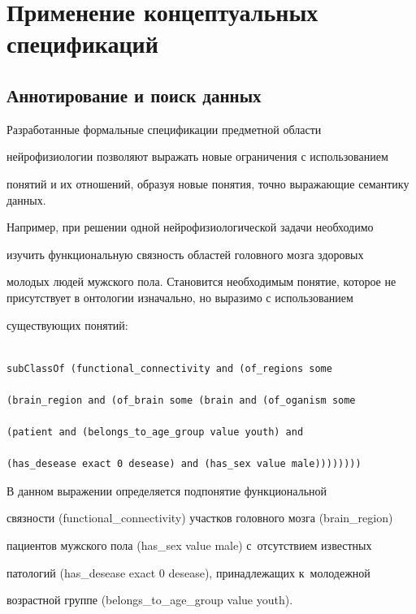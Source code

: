 \section{Применение концептуальных спецификаций}



\subsection{Аннотирование и поиск данных}



      

      Разработанные формальные спецификации предметной области 

нейрофизиологии позволяют выражать новые ограничения с использованием 

понятий и их отношений, образуя новые понятия, точно выражающие семантику данных.

      

Например, при решении одной нейрофизиологической задачи необходимо 

изучить функциональную связность областей головного мозга здоровых 

молодых людей мужского пола. Становится необходимым понятие, которое не присутствует в онтологии изначально, но выразимо с использованием 

существующих понятий:

      \begin{verbatim}

subClassOf (functional_connectivity and (of_regions some 

(brain_region and (of_brain some (brain and (of_oganism some 

(patient and (belongs_to_age_group value youth) and 

(has_desease exact 0 desease) and (has_sex value male))))))))

\end{verbatim}

      

      В данном выражении определяется подпонятие функциональной 

связ\-ности (functional\_connectivity) участков головного мозга (brain\_region) 

пациентов мужского пола (has\_sex value male) с~отсутствием известных 

патологий (has\_desease exact 0 desease), принадлежащих к~молодежной 

возрастной группе (belongs\_to\_age\_group value youth).

